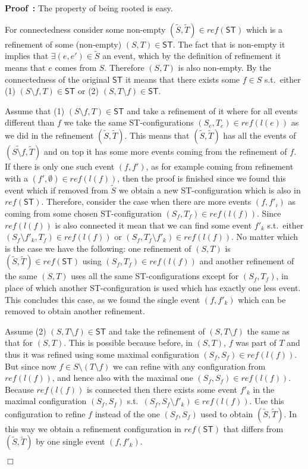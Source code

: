 \documentclass[submission,copyright,creativecommons]{eptcs}
\newenvironment{proof}[1][\!\!\,]{\vspace{1ex}\noindent\textbf{Proof #1: }}{\hfill$\Box$\vspace{2ex}}
\newcounter{case}
\newcommand\ST{\ensuremath{\mathsf{ST}}}
\newcommand\reffun{\ensuremath{\mathit{ref}}}
\newcommand\refinement[1]{\ensuremath{\widetilde{#1}}}
\begin{document}
\begin{proof}
The property of being rooted is easy. 

For connectedness consider some non-empty $(\refinement{S},\refinement{T})\in\reffun(\ST)$ which is a refinement of some (non-empty) $(S,T)\in\ST$. The fact that is non-empty it implies that $\exists (e,e')\in\refinement{S}$ an event, which by the definition of refinement it means that $e$ comes from $S$. Therefore $(S,T)$ is also non-empty. By the connectedness of the original $\ST$ it means that there exists some $f\in S$ s.t.\ either (1) $(S\setminus f,T)\in\ST$ or (2) $(S,T\setminus f)\in\ST$.

Assume that (1) $(S\setminus f,T)\in\ST$ and take a refinement of it where for all events different than $f$ we take the same ST-configurations $(S_{e},T_{e})\in\reffun(l(e))$ as we did in the refinement $(\refinement{S},\refinement{T})$. This means that $(\refinement{S},\refinement{T})$ has all the events of $(\refinement{S\setminus f},\refinement{T})$ and on top it has some more events coming from the refinement of $f$. If there is only one such event $(f,f')$, as for example coming from refinement with a $(f',\emptyset)\in\reffun(l(f))$, then the proof is finished since we found this event which if removed from $\refinement{S}$ we obtain a new ST-configuration which is also in $\reffun(\ST)$. Therefore, consider the case when there are more events $(f,f'_{i})$ as coming from some chosen ST-configuration $(S_{f},T_{f})\in\reffun(l(f))$. Since $\reffun(l(f))$ is also connected it mean that we can find some event $f'_{k}$ s.t.\ either $(S_{f}\setminus f'_{k},T_{f})\in\reffun(l(f))$ or $(S_{f},T_{f}\setminus f'_{k})\in\reffun(l(f))$. No matter which is the case we have the following: one refinement of $(S,T)$ is $(\refinement{S},\refinement{T})\in\reffun(\ST)$ using $(S_{f},T_{f})\in\reffun(l(f))$ and another refinement of the same $(S,T)$ uses all the same ST-configurations except for $(S_{f},T_{f})$, in place of which another ST-configuration is used which has exactly one less event. This concludes this case, as we found the single event $(f,f'_{k})$ which can be removed to obtain another refinement.

Assume (2) $(S,T\setminus f)\in\ST$ and take the refinement of $(S,T\setminus f)$ the same as that for $(S,T)$. This is possible because before, in $(S,T)$, $f$ was part of $T$ and thus it was refined using some maximal configuration $(S_{f},S_{f})\in\reffun(l(f))$. But since now $f\in S\setminus(T\setminus f)$ we can refine with any configuration from $\reffun(l(f))$, and hence also with the maximal one $(S_{f},S_{f})\in\reffun(l(f))$. Because $\reffun(l(f))$ is connected then there exists some event $f'_{k}$ in the maximal configuration $(S_{f},S_{f})$ s.t.\ $(S_{f},S_{f}\setminus f'_{k})\in\reffun(l(f))$. Use this configuration to refine $f$ instead of the one $(S_{f},S_{f})$ used to obtain $(\refinement{S},\refinement{T})$. In this way we obtain a refinement configuration in $\reffun(\ST)$ that differs from $(\refinement{S},\refinement{T})$ by one single event $(f,f'_{k})$.


\end{proof}
\end{document}
